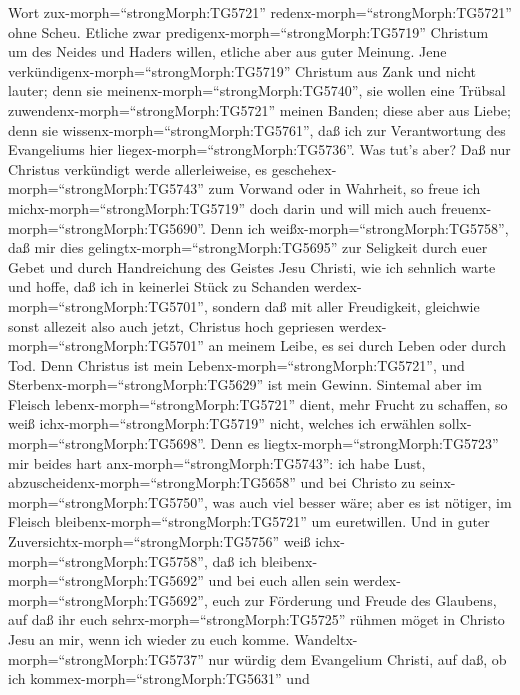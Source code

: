 Wort zux-morph=``strongMorph:TG5721''
redenx-morph=``strongMorph:TG5721'' ohne Scheu.  Etliche
zwar predigenx-morph=``strongMorph:TG5719'' Christum um des Neides und
Haders willen, etliche aber aus guter Meinung.  Jene
verkündigenx-morph=``strongMorph:TG5719'' Christum aus Zank und nicht
lauter; denn sie meinenx-morph=``strongMorph:TG5740'', sie wollen eine
Trübsal zuwendenx-morph=``strongMorph:TG5721'' meinen Banden;
 diese aber aus Liebe; denn sie
wissenx-morph=``strongMorph:TG5761'', daß ich zur Verantwortung des
Evangeliums hier liegex-morph=``strongMorph:TG5736''.  Was
tut's aber? Daß nur Christus verkündigt werde allerleiweise, es
geschehex-morph=``strongMorph:TG5743'' zum Vorwand oder in Wahrheit, so
freue ich michx-morph=``strongMorph:TG5719'' doch darin und will mich
auch freuenx-morph=``strongMorph:TG5690''.  Denn ich
weißx-morph=``strongMorph:TG5758'', daß mir dies
gelingtx-morph=``strongMorph:TG5695'' zur Seligkeit durch euer Gebet und
durch Handreichung des Geistes Jesu Christi,  wie ich
sehnlich warte und hoffe, daß ich in keinerlei Stück zu Schanden
werdex-morph=``strongMorph:TG5701'', sondern daß mit aller Freudigkeit,
gleichwie sonst allezeit also auch jetzt, Christus hoch gepriesen
werdex-morph=``strongMorph:TG5701'' an meinem Leibe, es sei durch Leben
oder durch Tod.  Denn Christus ist mein
Lebenx-morph=``strongMorph:TG5721'', und
Sterbenx-morph=``strongMorph:TG5629'' ist mein Gewinn. 
Sintemal aber im Fleisch lebenx-morph=``strongMorph:TG5721'' dient, mehr
Frucht zu schaffen, so weiß ichx-morph=``strongMorph:TG5719'' nicht,
welches ich erwählen sollx-morph=``strongMorph:TG5698''. 
Denn es liegtx-morph=``strongMorph:TG5723'' mir beides hart
anx-morph=``strongMorph:TG5743'': ich habe Lust,
abzuscheidenx-morph=``strongMorph:TG5658'' und bei Christo zu
seinx-morph=``strongMorph:TG5750'', was auch viel besser wäre;
 aber es ist nötiger, im Fleisch
bleibenx-morph=``strongMorph:TG5721'' um euretwillen.  Und
in guter Zuversichtx-morph=``strongMorph:TG5756'' weiß
ichx-morph=``strongMorph:TG5758'', daß ich
bleibenx-morph=``strongMorph:TG5692'' und bei euch allen sein
werdex-morph=``strongMorph:TG5692'', euch zur Förderung und Freude des
Glaubens,  auf daß ihr euch
sehrx-morph=``strongMorph:TG5725'' rühmen möget in Christo Jesu an mir,
wenn ich wieder zu euch komme. 
Wandeltx-morph=``strongMorph:TG5737'' nur würdig dem Evangelium Christi,
auf daß, ob ich kommex-morph=``strongMorph:TG5631'' und
